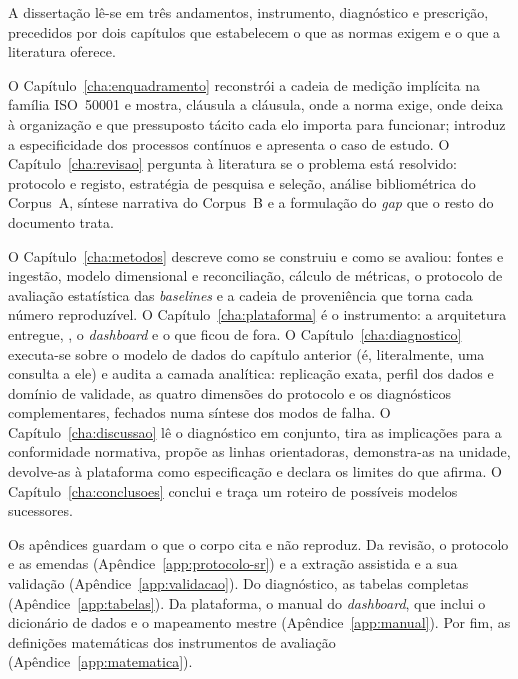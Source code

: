 A dissertação lê-se em três andamentos, instrumento, diagnóstico e
prescrição, precedidos por dois capítulos que estabelecem o que as
normas exigem e o que a literatura oferece.

O Capítulo~\ref{cha:enquadramento} reconstrói a cadeia de medição
implícita na família ISO~50001 e mostra, cláusula a cláusula, onde a
norma exige, onde deixa à organização e que pressuposto tácito cada elo
importa para funcionar; introduz a especificidade dos processos
contínuos e apresenta o caso de estudo. O Capítulo~\ref{cha:revisao}
pergunta à literatura se o problema está resolvido: protocolo e
registo, estratégia de pesquisa e seleção, análise bibliométrica do
Corpus~A, síntese narrativa do Corpus~B e a formulação do \emph{gap}
que o resto do documento trata.

O Capítulo~\ref{cha:metodos} descreve como se construiu e como se
avaliou: fontes e ingestão, modelo dimensional e reconciliação, cálculo
de métricas, o protocolo de avaliação estatística das \emph{baselines}
e a cadeia de proveniência que torna cada número reproduzível. O
Capítulo~\ref{cha:plataforma} é o instrumento: a arquitetura entregue,
, o \emph{dashboard} e o que
ficou de fora. O Capítulo~\ref{cha:diagnostico} executa-se sobre o
modelo de dados do capítulo anterior (é, literalmente, uma consulta a
ele) e audita a camada analítica: replicação exata, perfil dos dados e
domínio de validade, as quatro dimensões do protocolo e os diagnósticos
complementares, fechados numa síntese dos modos de falha. O
Capítulo~\ref{cha:discussao} lê o diagnóstico em conjunto, tira as
implicações para a conformidade normativa, propõe as linhas
orientadoras, demonstra-as na unidade, devolve-as à plataforma como
especificação e declara os limites do que afirma. O
Capítulo~\ref{cha:conclusoes} conclui e traça um roteiro de possíveis modelos
sucessores.


Os apêndices guardam o que o corpo cita e não reproduz. Da revisão, o
protocolo e as emendas (Apêndice~\ref{app:protocolo-sr}) e a extração
assistida e a sua validação (Apêndice~\ref{app:validacao}). Do diagnóstico,
as tabelas completas (Apêndice~\ref{app:tabelas}). Da plataforma, o manual
do \emph{dashboard}, que inclui o dicionário de dados e o mapeamento mestre
(Apêndice~\ref{app:manual}). Por fim, as definições matemáticas dos
instrumentos de avaliação (Apêndice~\ref{app:matematica}).

